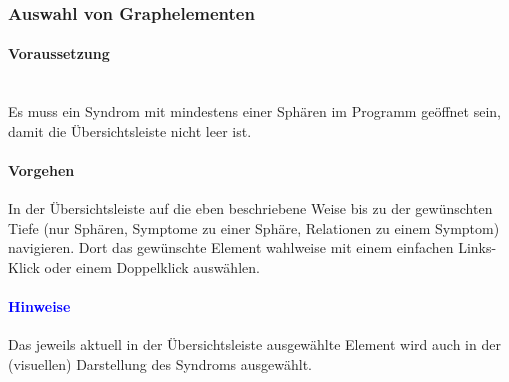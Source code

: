 \documentclass[enabledeprecatedfontcommands,fontsize=11pt,paper=a4,twoside]{scrartcl}
\newcounter{one}
\newcounter{two}[one]
\newcommand*{\hint}{\paragraph{\textcolor{blue}{Hinweise}}}
\newcommand*{\condition}{\paragraph{Voraussetzung}$\;$ \vspace{0.2cm}\\}
\newcommand*{\action}{\paragraph{Vorgehen}}
\let\tempone\itemize
\let\temptwo\enditemize
\renewenvironment{itemize}{\tempone\addtolength{\itemsep}{-10.0pt}}{\temptwo}
\let\origenumerate\enumerate
\let\origendenumerate\endenumerate
\renewenvironment{enumerate}{\origenumerate \addtolength{\itemsep}{-10.0pt}}{\origendenumerate}
\begin{document}
\subsubsection{Auswahl von Graphelementen}		
	\condition
	Es muss ein Syndrom mit mindestens einer Sphären im Programm geöffnet sein, damit die Übersichtsleiste nicht leer ist. 
	\action
	\begin{enumerate}
		\item In der Übersichtsleiste auf die eben beschriebene Weise bis zu der gewünschten Tiefe (nur Sphären, Symptome zu einer Sphäre, Relationen zu einem Symptom) navigieren. Dort das gewünschte Element wahlweise mit einem einfachen Links-Klick oder einem Doppelklick auswählen.
		\end{enumerate}
	\hint
	\begin{itemize}
		\item Das jeweils aktuell in der Übersichtsleiste ausgewählte Element wird auch in der (visuellen) Darstellung des Syndroms ausgewählt.\\
	\end{itemize}
		
\end{document}
